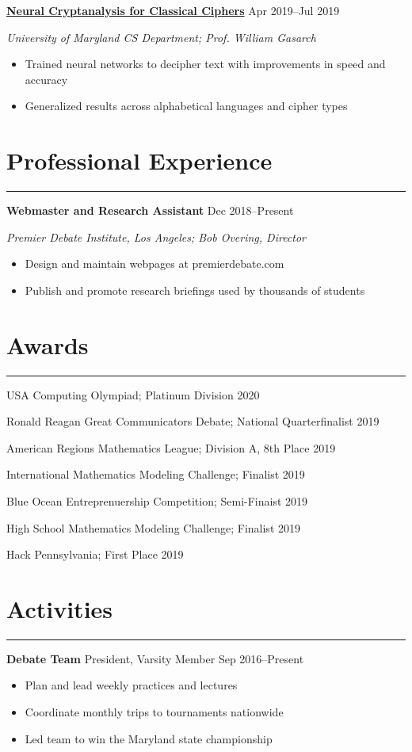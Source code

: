 \documentclass[11pt]{article}
\newcommand{\resumesection}[1]{\vspace{-0.3cm}\section*{\color{highlight}#1}\vspace{-0.3cm}\hrule\vspace{0.3cm}}
\begin{document}
\textbf{\href{https://github.com/petezh/Neural-Cryptanalysis}{Neural Cryptanalysis for Classical Ciphers}} \hfill Apr 2019--Jul 2019\par
\textit{University of Maryland CS Department; Prof. William Gasarch}
\begin{itemize}
	\item Trained neural networks to decipher text with improvements in speed and accuracy
	\item Generalized results across alphabetical languages and cipher types
\end{itemize}\vspace{0.1cm}


\resumesection{Professional Experience}

\textbf{Webmaster and Research Assistant}   \hfill Dec 2018--Present \par
\textit{Premier Debate Institute, Los Angeles; Bob Overing, Director}
\begin{itemize}
	\item Design and maintain webpages at premierdebate.com
	\item Publish and promote research briefings used by thousands of students
\end{itemize}

\resumesection{Awards}

USA Computing Olympiad; Platinum Division \hfill 2020 \par
Ronald Reagan Great Communicators Debate; National Quarterfinalist \hfill 2019 \par
American Regions Mathematics League; Division A, 8th Place \hfill 2019 \par
International Mathematics Modeling Challenge; Finalist \hfill 2019\par
Blue Ocean Entreprenuership Competition; Semi-Finaist \hfill 2019 \par
High School Mathematics Modeling Challenge; Finalist \hfill 2019\par
Hack Pennsylvania; First Place \hfill 2019\par


\resumesection{Activities}

\textbf{Debate Team} President, Varsity Member \hfill Sep 2016--Present \par
\begin{itemize}
	\item Plan and lead weekly practices and lectures
	\item Coordinate monthly trips to tournaments nationwide
	\item Led team to win the Maryland state championship
\end{itemize}\vspace{0.1cm}
\end{document}
